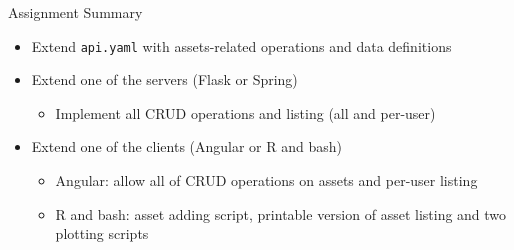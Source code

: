 \begin{frame}{Assignment Summary}
    \begin{itemize}
        \item Extend \lstinline{api.yaml} with assets-related operations and data definitions
        \item Extend one of the servers (Flask or Spring)
            \begin{itemize}
                \item Implement all CRUD operations and listing (all and per-user)
            \end{itemize}
        \item Extend one of the clients (Angular or R and bash)
            \begin{itemize}
                \item Angular: allow all of CRUD operations on assets and per-user listing
                \item R and bash: asset adding script, printable version of asset listing and two plotting scripts
            \end{itemize}
    \end{itemize}
\end{frame}
